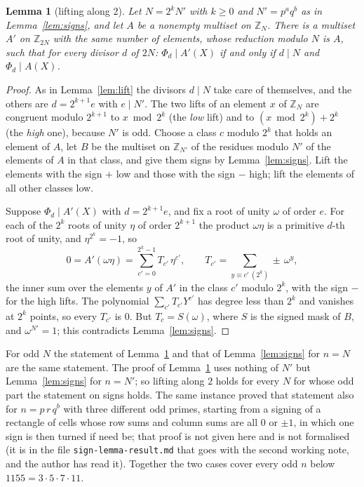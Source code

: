 \documentclass[11pt,a4paper]{amsart}
\newtheorem{lemma}[theorem]{Lemma}
\theoremstyle{definition}
\theoremstyle{remark}
\newcommand{\Z}{\mathbb{Z}}
\begin{document}
\begin{lemma}[lifting along 2]\label{lem:lift2}
Let $N=2^kN'$ with $k\ge0$ and $N'=p^aq^b$ as in Lemma~\ref{lem:signs}, and let $A$ be a nonempty multiset on $\Z_N$.
There is a multiset $A'$ on $\Z_{2N}$ with the same number of elements, whose reduction modulo $N$ is $A$, such
that for every divisor $d$ of $2N$: $\Phi_d\mid A'(X)$ if and only if $d\mid N$ and $\Phi_d\mid A(X)$.
\end{lemma}
\begin{proof}
As in Lemma~\ref{lem:lift} the divisors $d\mid N$ take care of themselves, and the others are $d=2^{k+1}e$ with
$e\mid N'$. The two lifts of an element $x$ of $\Z_N$ are congruent modulo $2^{k+1}$ to $x\bmod 2^k$ (the
\emph{low} lift) and to $(x\bmod2^k)+2^k$ (the \emph{high} one), because $N'$ is odd. Choose a class $c$ modulo
$2^k$ that holds an element of $A$, let $B$ be the multiset on $\Z_{N'}$ of the residues modulo $N'$ of the
elements of $A$ in that class, and give them signs by Lemma~\ref{lem:signs}. Lift the elements with the sign
$+$ low and those with the sign $-$ high; lift the elements of all other classes low.

Suppose $\Phi_d\mid A'(X)$ with $d=2^{k+1}e$, and fix a root of unity $\omega$ of order $e$. For each of the $2^k$
roots of unity $\eta$ of order $2^{k+1}$ the product $\omega\eta$ is a primitive $d$-th root of unity, and
$\eta^{2^k}=-1$, so
\[
0=A'(\omega\eta)=\sum_{c'=0}^{2^k-1}T_{c'}\,\eta^{c'},\qquad T_{c'}=\sum_{y\equiv c'\ (2^k)}\pm\,\omega^{y},
\]
the inner sum over the elements $y$ of $A'$ in the class $c'$ modulo $2^k$, with the sign $-$ for the high lifts.
The polynomial $\sum_{c'}T_{c'}Y^{c'}$ has degree less than $2^k$ and vanishes at $2^k$ points, so every
$T_{c'}$ is $0$. But $T_c=S(\omega)$, where $S$ is the signed mask of $B$, and $\omega^{N'}=1$; this contradicts
Lemma~\ref{lem:signs}.
\end{proof}

For odd $N$ the statement of Lemma~\ref{lem:lift2} and that of Lemma~\ref{lem:signs} for $n=N$ are the same
statement. The proof of Lemma~\ref{lem:lift2} uses nothing of $N'$ but Lemma~\ref{lem:signs} for $n=N'$; so
lifting along $2$ holds for every $N$ for whose odd part the statement on signs holds. The same instance proved
that statement also for $n=p\,r\,q^b$ with three different odd primes, starting from a signing of a rectangle of cells
whose row sums and column sums are all $0$ or $\pm1$, in which one sign is then turned if need be; that proof is not
given here and is not formalised (it is in the file \texttt{sign-lemma-result.md} that goes with the second working
note, and the author has read it). Together the
two cases cover every odd $n$ below $1155=3\cdot5\cdot7\cdot11$.
\end{document}
